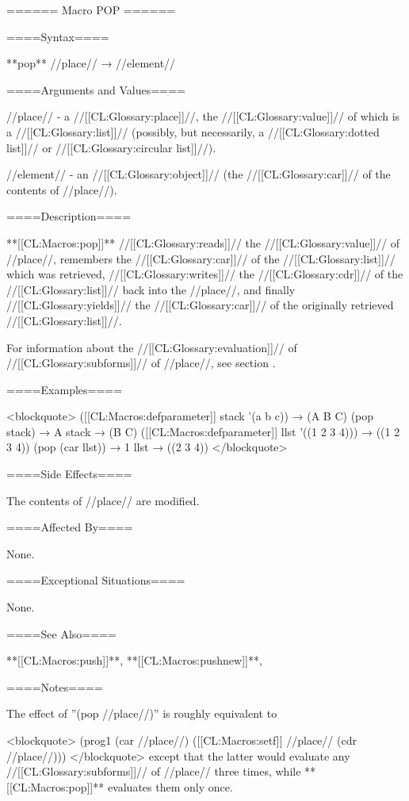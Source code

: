 ====== Macro POP ======

====Syntax====

**pop** //place// → //element//

====Arguments and Values====

//place// - a //[[CL:Glossary:place]]//, the //[[CL:Glossary:value]]// of which is a //[[CL:Glossary:list]]// (possibly, but necessarily, a //[[CL:Glossary:dotted list]]// or //[[CL:Glossary:circular list]]//).

//element// - an //[[CL:Glossary:object]]// (the //[[CL:Glossary:car]]// of the contents of //place//).

====Description====

**[[CL:Macros:pop]]** //[[CL:Glossary:reads]]// the //[[CL:Glossary:value]]// of //place//, remembers the //[[CL:Glossary:car]]// of the //[[CL:Glossary:list]]// which was retrieved, //[[CL:Glossary:writes]]// the //[[CL:Glossary:cdr]]// of the //[[CL:Glossary:list]]// back into the //place//, and finally //[[CL:Glossary:yields]]// the //[[CL:Glossary:car]]// of the originally retrieved //[[CL:Glossary:list]]//.

For information about the //[[CL:Glossary:evaluation]]// of //[[CL:Glossary:subforms]]// of //place//, see section {\secref\GenRefSubFormEval}.

====Examples====

<blockquote> ([[CL:Macros:defparameter]] stack '(a b c)) → (A B C) (pop stack) → A stack → (B C) ([[CL:Macros:defparameter]] llst '((1 2 3 4))) → ((1 2 3 4)) (pop (car llst)) → 1 llst → ((2 3 4)) </blockquote>

====Side Effects====

The contents of //place// are modified.

====Affected By====

None.

====Exceptional Situations====

None.

====See Also====

**[[CL:Macros:push]]**, **[[CL:Macros:pushnew]]**, {\secref\GeneralizedReference}

====Notes====

The effect of ''(pop //place//)'' is roughly equivalent to

<blockquote> (prog1 (car //place//) ([[CL:Macros:setf]] //place// (cdr //place//))) </blockquote> except that the latter would evaluate any //[[CL:Glossary:subforms]]// of //place// three times, while **[[CL:Macros:pop]]** evaluates them only once.

 
